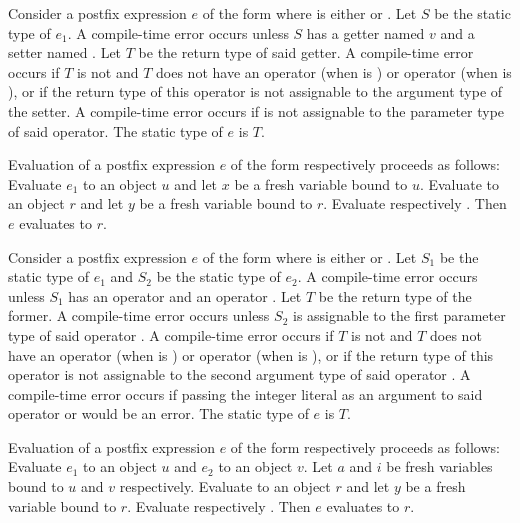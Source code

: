 \documentclass[makeidx]{article}
\begin{document}
{\LMHash{}%
Consider a postfix expression $e$ of the form 
where \op{} is either \lit{++} or \lit{-{}-}.
Let $S$ be the static type of $e_1$.
A compile-time error occurs unless $S$ has
a getter named $v$ and a setter named 
.
Let $T$ be the return type of said getter.
A compile-time error occurs if $T$ is not \DYNAMIC{}
and $T$ does not have an operator \lit{+} (when \op{} is \lit{++})
or operator \lit{-} (when \op{} is \lit{-{}-}),
or if the return type of this operator is not assignable to
the argument type of the setter.
A compile-time error occurs if  is not assignable to
the parameter type of said operator.
The static type of $e$ is $T$.

\LMHash{}%
Evaluation of a postfix expression $e$
of the form  respectively 
proceeds as follows:
Evaluate $e_1$ to an object $u$ and let $x$ be a fresh variable bound to $u$.
Evaluate  to an object $r$
and let $y$ be a fresh variable bound to $r$.
Evaluate  respectively .
Then $e$ evaluates to $r$.
\EndCase

\LMHash{}%
Consider a postfix expression $e$ of the form 
where \op{} is either \lit{++} or \lit{-{}-}.
Let $S_1$ be the static type of $e_1$
and $S_2$ be the static type of $e_2$.
A compile-time error occurs unless $S_1$ has
an operator \lit{[]} and an operator \lit{[]=}.
Let $T$ be the return type of the former.
A compile-time error occurs unless $S_2$ is assignable to
the first parameter type of said operator \lit{[]=}.
A compile-time error occurs if $T$ is not \DYNAMIC{}
and $T$ does not have an operator \lit{+} (when \op{} is \lit{++})
or operator \lit{-} (when \op{} is \lit{-{}-}),
or if the return type of this operator is not assignable to
the second argument type of said operator \lit{[]=}.
A compile-time error occurs if passing the integer literal 
as an argument to said operator \lit{+} or \lit{-} would be an error.
The static type of $e$ is $T$.

\LMHash{}%
Evaluation of a postfix expression $e$
of the form  respectively 
proceeds as follows:
Evaluate $e_1$ to an object $u$ and $e_2$ to an object $v$.
Let $a$ and $i$ be fresh variables bound to $u$ and $v$ respectively.
Evaluate  to an object $r$
and let $y$ be a fresh variable bound to $r$.
Evaluate  respectively .
Then $e$ evaluates to $r$.
\EndCase

}
\end{document}

